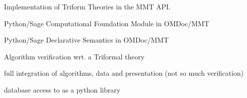 \begin{workpackage}[id=dksbases,wphases=1-48!.5,
  title=Data/Knowledge/Software-Bases,lead=JU,
  ZHRM=12,JURM=36,USHRM=12,UWRM=25,SARM=10,LLRM=2,PSRM=4]
\begin{wpdelivs}
\begin{wpdeliv}[due=24,id=dksimp,dissem=PU,nature=OTHER,lead=JU]
        {Implementation of Triform Theories in the MMT API.}
  \end{wpdeliv}
  \begin{wpdeliv}[due=24,id=psfoundation,dissem=PU,nature=OTHER,lead=JU]
        {Python/Sage Computational Foundation Module in OMDoc/MMT}
  \end{wpdeliv}
  \begin{wpdeliv}[due=36,id=pssem,dissem=PU,nature=OTHER,lead=JU]
      {Python/Sage Declarative Semantics in OMDoc/MMT}
  \end{wpdeliv}
  \begin{wpdeliv}[due=36,id=lfmverif,dissem=PU,nature=OTHER,lead=JU]
      {\LMFDB Algorithm verification wrt. a Triformal theory}
  \end{wpdeliv}
  \begin{wpdeliv}[due=46,id=lfmint,dissem=PU,nature=R,lead=JU]
      {\LMFDB full integration of algorithms, data and presentation (not so much verification)}
  \end{wpdeliv}
\end{wpdelivs}

\begin{comment}
Another connection: on several occasions, we found that software was the best way to
represent certain databases of mathematical knowledge. E.g. in Algebraic Combinatorics we
have a whole zoo of Hopf algebras. Many of them are implemented in MuPAD/Sage by
specifying the objects that index the basis together with computation rules for the
product and coproduct. When we want to retrieve information about such algebras, it's
usually much more convenient to look at the code than to search through the
literature. Especially since the code is usually more correct than the literature because
it's *tested*.

We may also think of providing an interface to \LMFDB via SCSCP
protocol (http://www.symbolic-computing.org/scscp) so it may
be accessed by a variety of other systems (see their current
list at http://www.symbolic-computing.org/scscp). But it's probably as
good to access it via \Sage.

\end{comment}

database access to \LMFDB as a python library
\end{workpackage}

